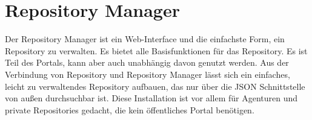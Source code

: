 \section[sec:repository manager]{Repository Manager}
Der Repository Manager ist ein Web-Interface und die einfachste Form, ein Repository zu verwalten. Es bietet alle Basisfunktionen für das Repository. Es ist Teil des Portals, kann aber auch unabhängig davon genutzt werden.
Aus der Verbindung von Repository und Repository Manager lässt sich ein einfaches, leicht zu verwaltendes Repository aufbauen, das nur über die JSON Schnittstelle von außen durchsuchbar ist.
Diese Installation ist vor allem für Agenturen und private Repositories gedacht, die kein öffentliches Portal benötigen.

